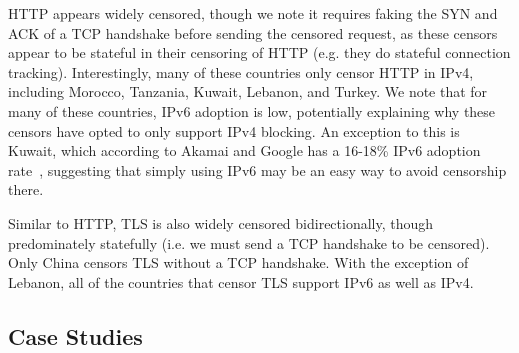 
HTTP appears widely censored, though we note it requires faking the SYN and ACK of
a TCP handshake before sending the censored request, as these censors appear to
be stateful in their censoring of HTTP (e.g. they do stateful connection
tracking). Interestingly, many of these countries only censor HTTP in IPv4,
including Morocco, Tanzania, Kuwait, Lebanon, and Turkey. We note that for many
of these countries, IPv6 adoption is low, potentially explaining why these
censors have opted to only support IPv4 blocking. An exception to this is
Kuwait, which according to Akamai and Google has a 16-18\% IPv6 adoption
rate~\cite{akamai-ipv6,Google-IPv6}, suggesting that simply using IPv6 may be an
easy way to avoid censorship there.


Similar to HTTP, TLS is also widely censored bidirectionally, though
predominately statefully (i.e. we must send a TCP handshake to be censored).
Only China censors TLS without a TCP handshake. With the exception of Lebanon,
all of the countries that censor TLS support IPv6 as well as IPv4.



\subsection{Case Studies}
\label{sec:prevalence:case}

